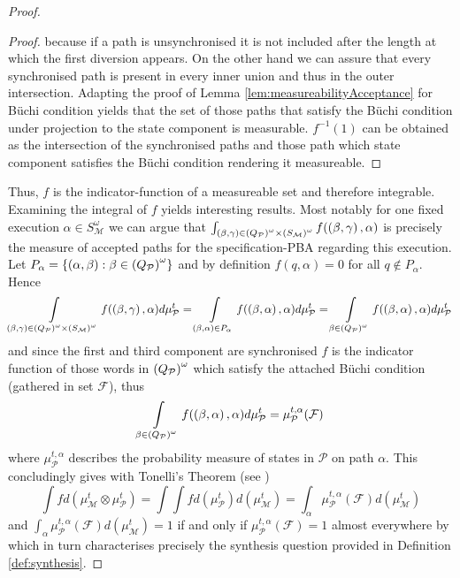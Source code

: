 \begin{proof}
\begin{proof}
  because if a path is unsynchronised it is not included after the length at
  which the first diversion appears. On the other hand we can assure that every
  synchronised path is present in every inner union and thus in the outer
  intersection. Adapting the proof of Lemma \ref{lem:measureabilityAcceptance}
  for Büchi condition yields that the set of those paths that satisfy the Büchi
  condition under projection to the state component is measurable. $f^{-1}(1)$
  can be obtained as the intersection of the synchronised paths and those
  path which state component satisfies the Büchi condition rendering it
  measureable.
\end{proof}
Thus, $f$ is the indicator-function of a measureable set and therefore
integrable. Examining the integral of $f$ yields interesting results. Most
notably for one fixed execution $\alpha\in S_{\mathcal{M}}^{\omega}$ we can
argue that $\int_{\left(\beta,\gamma\right)\in
\left(Q_{\mathcal{P}}\right)^{\omega}\times\left(S_{\mathcal{M}}\right)^{\omega}}
f(\left(\beta,\gamma\right),\alpha)$ is precisely the measure of accepted paths for
the specification-\ac{PBA} regarding this execution. Let
$P_{\alpha} = \left\{\left(\alpha, \beta\right):\beta\in
\left(Q_{\mathcal{P}}\right)^{\omega}\right\}$ and by definition $f(q, \alpha) = 0$ for all
$q\not\in P_{\alpha}$. Hence
\begin{equation*}
  \int\limits_{\left(\beta,\gamma\right)\in
  \left(Q_{\mathcal{P}}\right)^{\omega}\times\left(S_{\mathcal{M}}\right)^{\omega}}
  f(\left(\beta,\gamma\right),\alpha)d\mu_{\mathcal{P}}^{t}
  =\int\limits_{\left(\beta,\alpha\right)\in P_{\alpha}}
  f(\left(\beta,\alpha\right),\alpha)d\mu_{\mathcal{P}}^{t}
  =\int\limits_{\beta\in\left(Q_{\mathcal{P}}\right)^{\omega}}
  f(\left(\beta,\alpha\right),\alpha)d\mu_{\mathcal{P}}^{t}
\end{equation*}
and since the first and third component are synchronised $f$ is the indicator
function of those words in $\left(Q_{\mathcal{P}}\right)^{\omega}$ which satisfy the
attached Büchi condition (gathered in set $\mathcal{F}$), thus
\begin{equation*}
  \int\limits_{\beta\in\left(Q_{\mathcal{P}}\right)^{\omega}}
  f(\left(\beta,\alpha\right),\alpha)d\mu_{\mathcal{P}}^{t}
  = \mu_{\mathcal{P}}^{t,\alpha}(\mathcal{F})
\end{equation*}
where $\mu_{\mathcal{P}}^{t,\alpha}$ describes the probability measure of
states in $\mathcal{P}$ on path $\alpha$. This concludingly gives with
Tonelli's Theorem (see \cite[Theorem 23.6]{Bauer})
\begin{equation*}
  \int f d(\mu_{\mathcal{M}}^{t}\otimes\mu_{\mathcal{P}}^{t}) =
  \int\int f d(\mu_{\mathcal{P}}^{t})d(\mu_{\mathcal{M}}^{t}) =
  \int_{\alpha}\mu_{\mathcal{P}}^{t,\alpha}(\mathcal{F})d(\mu_{\mathcal{M}}^{t})
\end{equation*}
and $\int_{\alpha}\mu_{\mathcal{P}}^{t,\alpha}(\mathcal{F})
d(\mu_{\mathcal{M}}^{t}) = 1$ if and only if
$\mu_{\mathcal{P}}^{t,\alpha}(\mathcal{F}) = 1$ almost everywhere by
\cite[Lemma 40]{RandAutoInfTrees} which in turn characterises precisely the
synthesis question provided in Definition \ref{def:synthesis}.


\end{proof}
